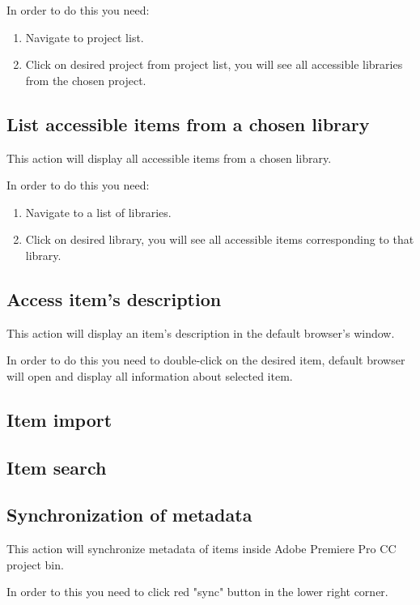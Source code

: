 \documentclass[thesis=B,english]{FITthesis}[2012/10/20]
\begin{document}
In order to do this you need:
	\begin{enumerate}
		\item Navigate to project list.
		\item Click on desired project from project list, you will see all accessible libraries from the chosen project.
	\end{enumerate}
\subsection{List accessible items from a chosen library}
This action will display all accessible items from a chosen library.

In order to do this you need:
	\begin{enumerate}
		\item Navigate to a list of libraries.
		\item Click on desired library, you will see all accessible items corresponding to that library.
	\end{enumerate}
\subsection{Access item's description}
This action will display an item's description in the default browser's window.

In order to do this you need to double-click on the desired item, default browser will open and display all information about selected item.
\subsection{Item import}

\subsection{Item search}

\subsection{Synchronization of metadata}
This action will synchronize metadata of items inside Adobe Premiere Pro CC project bin.

In order to this you need to click red "sync" button in the lower right corner.
\end{document}
